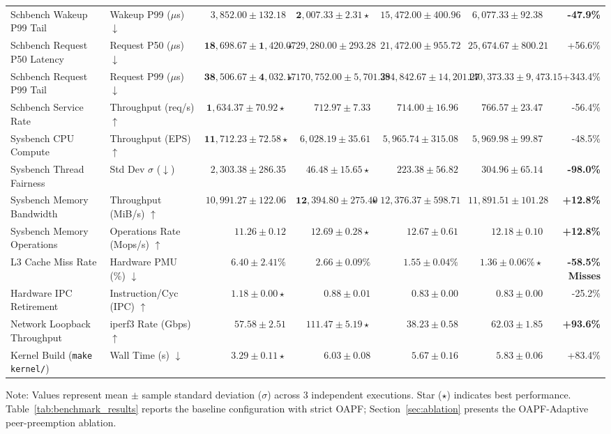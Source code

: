 \documentclass[letterpaper,twocolumn,10pt]{article}
\begin{document}
\begin{table}[t!]
{\begin{tabular}{llrrrrr}
Schbench Wakeup P99 Tail & Wakeup P99 ($\mu$s) $\downarrow$ & $3{,}852.00 \pm 132.18$ & $\mathbf{2{,}007.33 \pm 2.31} \star$ & $15{,}472.00 \pm 400.96$ & $6{,}077.33 \pm 92.38$ & \textbf{-47.9\%} \\
Schbench Request P50 Latency & Request P50 ($\mu$s) $\downarrow$ & $\mathbf{18{,}698.67 \pm 1{,}420.07} \star$ & $29{,}280.00 \pm 293.28$ & $21{,}472.00 \pm 955.72$ & $25{,}674.67 \pm 800.21$ & +56.6\% \\
Schbench Request P99 Tail & Request P99 ($\mu$s) $\downarrow$ & $\mathbf{38{,}506.67 \pm 4{,}032.17} \star$ & $170{,}752.00 \pm 5{,}701.39$ & $284{,}842.67 \pm 14{,}201.27$ & $140{,}373.33 \pm 9{,}473.15$ & +343.4\% \\
Schbench Service Rate & Throughput (req/s) $\uparrow$ & $\mathbf{1{,}634.37 \pm 70.92} \star$ & $712.97 \pm 7.33$ & $714.00 \pm 16.96$ & $766.57 \pm 23.47$ & -56.4\% \\
Sysbench CPU Compute & Throughput (EPS) $\uparrow$ & $\mathbf{11{,}712.23 \pm 72.58} \star$ & $6{,}028.19 \pm 35.61$ & $5{,}965.74 \pm 315.08$ & $5{,}969.98 \pm 99.87$ & -48.5\% \\
Sysbench Thread Fairness & Std Dev $\sigma$ ($\downarrow$) & $2{,}303.38 \pm 286.35$ & $\mathbf{46.48 \pm 15.65} \star$ & $223.38 \pm 56.82$ & $304.96 \pm 65.14$ & \textbf{-98.0\%} \\
Sysbench Memory Bandwidth & Throughput (MiB/s) $\uparrow$ & $10{,}991.27 \pm 122.06$ & $\mathbf{12{,}394.80 \pm 275.40} \star$ & $12{,}376.37 \pm 598.71$ & $11{,}891.51 \pm 101.28$ & \textbf{+12.8\%} \\
Sysbench Memory Operations & Operations Rate (Mops/s) $\uparrow$ & $11.26 \pm 0.12$ & $\mathbf{12.69 \pm 0.28} \star$ & $12.67 \pm 0.61$ & $12.18 \pm 0.10$ & \textbf{+12.8\%} \\
L3 Cache Miss Rate & Hardware PMU (\%) $\downarrow$ & $6.40 \pm 2.41\%$ & $2.66 \pm 0.09\%$ & $1.55 \pm 0.04\%$ & $\mathbf{1.36 \pm 0.06\%} \star$ & \textbf{-58.5\% Misses} \\
Hardware IPC Retirement & Instruction/Cyc (IPC) $\uparrow$ & $\mathbf{1.18 \pm 0.00} \star$ & $0.88 \pm 0.01$ & $0.83 \pm 0.00$ & $0.83 \pm 0.00$ & -25.2\% \\
Network Loopback Throughput & iperf3 Rate (Gbps) $\uparrow$ & $57.58 \pm 2.51$ & $\mathbf{111.47 \pm 5.19} \star$ & $38.23 \pm 0.58$ & $62.03 \pm 1.85$ & \textbf{+93.6\%} \\
Kernel Build (\texttt{make kernel/}) & Wall Time (s) $\downarrow$ & $\mathbf{3.29 \pm 0.11} \star$ & $6.03 \pm 0.08$ & $5.67 \pm 0.16$ & $5.83 \pm 0.06$ & +83.4\% \\
\bottomrule
\end{tabular}%
}
\vspace{0.5ex}
\raggedright \scriptsize Note: Values represent mean $\pm$ sample standard deviation ($\sigma$) across 3 independent executions. Star ($\star$) indicates best performance. Table~\ref{tab:benchmark_results} reports the baseline configuration with strict OAPF; Section~\ref{sec:ablation} presents the OAPF-Adaptive peer-preemption ablation.
\end{table}
\end{document}

